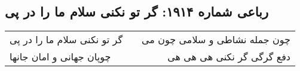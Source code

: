\begin{center}
\section*{رباعی شماره ۱۹۱۴: گر تو نکنی سلام ما را در پی}
\label{sec:1914}
\begin{longtable}{l p{0.5cm} r}
گر تو نکنی سلام ما را در پی
&&
چون جمله نشاطی و سلامی چون می
\\
چوپان جهانی و امان جانها
&&
دفع گرگی گر نکنی هی هی هی
\\
\end{longtable}
\end{center}
